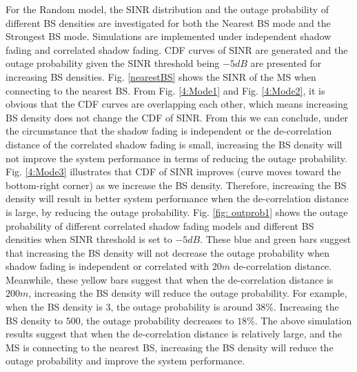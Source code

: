 \documentclass[journal,10pt]{IEEEtran}
\begin{document}
 \par For the Random model, the SINR distribution and the outage probability of different BS densities are investigated for both the Nearest BS mode and the Strongest BS mode. Simulations are implemented under independent shadow fading and correlated shadow fading. CDF curves of SINR are generated and the outage probability given the SINR threshold being $-5dB$ are presented for increasing BS densities. Fig. \ref{nearestBS} shows the SINR of the MS when connecting to the nearest BS. From Fig. \ref{4:Mode1} and Fig. \ref{4:Mode2}, it is obvious that the CDF curves are overlapping each other, which means increasing BS density does not change the CDF of SINR. From this we can conclude, under the circumstance that the shadow fading is independent or the de-correlation distance of the correlated shadow fading is small, increasing the BS density will not improve the system performance in terms of reducing the outage probability. Fig. \ref{4:Mode3}  illustrates that CDF of SINR improves (curve moves toward the bottom-right corner) as we increase the BS density. Therefore, increasing the BS density will result in better system performance when the de-correlation distance is large, by reducing the outage probability. Fig. \ref{fig: outprob1} shows the outage probability of different correlated shadow fading models and different BS densities when SINR threshold is set to $-5dB$. These blue and green bars suggest that increasing the BS density will not decrease the outage probability when shadow fading is independent or correlated with $20m$ de-correlation distance. Meanwhile, these yellow bars suggest that when the de-correlation distance is $200m$, increasing the BS density will reduce the outage probability. For example, when the BS density is $3$, the outage probability is around $38\%$. Increasing the BS density to $500$, the outage probability decreases to $18\%$. The above simulation results suggest that when the de-correlation distance is relatively large, and the MS is connecting to the nearest BS, increasing the BS density will reduce the outage probability and improve the system performance.
\end{document}
